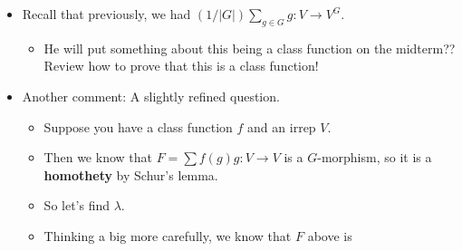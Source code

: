 \documentclass[../notes.tex]{subfiles}
\begin{document}
\begin{itemize}
    \begin{equation*}
        F = \sum_{g\in G}f(g)\cdot g:V\to V
    \end{equation*}
    is a morphism of $G$-representations, that is, $F\in\Hom_G(V,V)$.
    \begin{proof}
        To prove that $F\in\Hom_G(V,V)$, it will suffice to show that $xF=Fx$ for every $x\in G$. Let $x\in G$ be arbitrary. Then
        \begin{align*}
            F(xv) &= \sum_{g\in G}f(g)gxv
            \intertext{Since $\rho$ is a group homomorphism, the functions $\rho(g)\in GL(V)$ act just like the elements $g\in G$. \emph{This} is what justifies us to basically move everything around all willy-nilly. Thus, continuing from the above, we have}
            &= \sum_{g\in G}f(g)(xx^{-1})gxv\\
            &= \sum_{g\in G}f(g)x(x^{-1}gx)v\\
            \intertext{Since $x=\rho(x)$ is in the general \emph{linear} group, i.e., is a \emph{linear} map, we can factor it out of the sum of functions to get}
            &= x\left( \sum_{g\in G}f(g)x^{-1}gx \right)v\\
            \intertext{Since $f$ is a class function by hypothesis, we have $f(g)=f(x^{-1}gx)$, so}
            &= x\left( \sum_{g\in G}f(x^{-1}gx)x^{-1}gxv \right)\\
            &= x\sum_{g\in G}f(g)gv\\
            &= x(Fv)
        \end{align*}
        as desired.
    \end{proof}
    \item Recall that previously, we had $(1/|G|)\sum_{g\in G}g:V\to V^G$.
    \begin{itemize}
        \item He will put something about this being a class function on the midterm?? Review how to prove that this is a class function!
    \end{itemize}
    \item Another comment: A slightly refined question.
    \begin{itemize}
        \item Suppose you have a class function $f$ and an irrep $V$.
        \item Then we know that $F=\sum f(g)g:V\to V$ is a $G$-morphism, so it is a \textbf{homothety} by Schur's lemma.
        \item So let's find $\lambda$.
        \item Thinking a big more carefully, we know that $F$ above is

\end{itemize}
\end{itemize}
\end{document}
